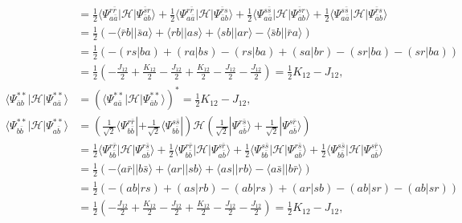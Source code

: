 \documentclass[a4paper]{book}
\newcounter{solution}[chapter]
\begin{document}
\begin{solution}
\begin{itemize}
\begin{align*}
		&= \frac{1}{2} \langle \Psi^{ r \bar{r} }_{a \bar{a}} | \mathscr{H} | \Psi^{ \bar{s} r }_{\bar{a} b} \rangle + \frac{1}{2} \langle \Psi^{ r \bar{r} }_{a \bar{a}} | \mathscr{H} | \Psi^{ \bar{r} s }_{ \bar{a} b } \rangle + \frac{1}{2} \langle \Psi^{ s \bar{s} }_{a \bar{a}} | \mathscr{H} | \Psi^{ \bar{s} r }_{ \bar{a} b } \rangle + \frac{1}{2} \langle \Psi^{ s \bar{s} }_{a \bar{a}} | \mathscr{H} | \Psi^{ \bar{r} s }_{ \bar{a} b } \rangle \\
		&= \frac{1}{2} \left( - \langle \bar{r} b || \bar{s} a \rangle + \langle r b || a s \rangle + \langle s b || a r \rangle - \langle \bar{s} b || \bar{r} a \rangle \right) \\
		&= \frac{1}{2} \left( - (rs|ba) + (ra|bs) - (rs|ba) + (sa|br) - (sr|ba) - (sr|ba) \right) \\
		&= \frac{1}{2} \left( - \frac{ J_{12} }{2} + \frac{ K_{12} }{2} - \frac{ J_{12} }{2} + \frac{ K_{12} }{2} - \frac{ J_{12} }{2} - \frac{ J_{12} }{2} \right) = \frac{1}{2} K_{12} - J_{12}, \\
		\langle \Psi^{**}_{\bar{a} b} | \mathscr{H} | \Psi^{**}_{a \bar{a}} \rangle &= ( \langle \Psi^{**}_{a\bar{a}} | \mathscr{H} | \Psi^{**}_{\bar{a} b} \rangle )^* = \frac{1}{2} K_{12} - J_{12}, \\
		\langle \Psi^{**}_{b\bar{b}} | \mathscr{H} | \Psi^{**}_{a\bar{b}} \rangle &= \left( \frac{1}{ \sqrt{2} } \langle \Psi^{ r \bar{r} }_{b \bar{b}} | + \frac{1}{ \sqrt{2} } \langle \Psi^{ s \bar{s} }_{b \bar{b}} | \right) \mathscr{H} \left( \frac{1}{ \sqrt{2} } | \Psi^{ r \bar{s} }_{a \bar{b}} \rangle + \frac{1}{ \sqrt{2} } | \Psi^{ s \bar{r} }_{a \bar{b}} \rangle \right) \\
		&= \frac{1}{2} \langle \Psi^{ r \bar{r} }_{b \bar{b}} | \mathscr{H} | \Psi^{ r \bar{s} }_{a \bar{b}} \rangle + \frac{1}{2} \langle \Psi^{ r \bar{r} }_{b \bar{b}} | \mathscr{H} | \Psi^{ s \bar{r} }_{a \bar{b}} \rangle + \frac{1}{2} \langle \Psi^{ s \bar{s} }_{b \bar{b}} | \mathscr{H} | \Psi^{ r \bar{s} }_{a \bar{b}} \rangle + \frac{1}{2} \langle \Psi^{ s \bar{s} }_{b \bar{b}} | \mathscr{H} | \Psi^{ s \bar{r} }_{a \bar{b}} \rangle \\
		&= \frac{1}{2} \left( - \langle a \bar{r} || b \bar{s} \rangle + \langle a r || s b \rangle + \langle a s || r b \rangle - \langle a \bar{s} || b \bar{r} \rangle \right) \\
		&= \frac{1}{2} \left( -(ab|rs) + (as|rb) - (ab|rs) + (ar|sb) - (ab|sr) - (ab|sr) \right) \\
		&= \frac{1}{2} \left( - \frac{ J_{12} }{2} + \frac{ K_{12} }{2} - \frac{ J_{12} }{2} + \frac{ K_{12} }{2} - \frac{ J_{12} }{2} - \frac{ J_{12} }{2} \right) = \frac{1}{2} K_{12} - J_{12}, \\

\end{align*}
\end{itemize}
\end{solution}
\end{document}
